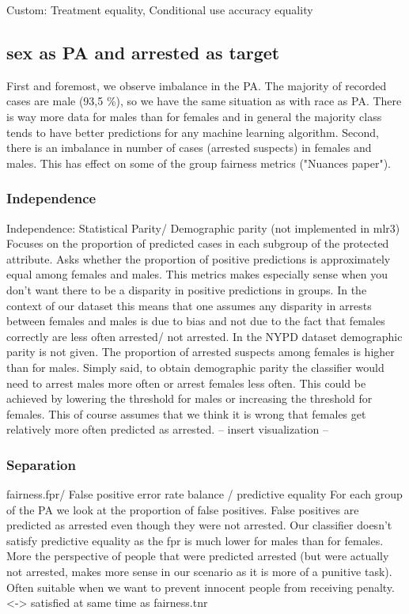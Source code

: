 \documentclass{article}
\begin{document}
Custom: Treatment equality, Conditional use accuracy equality


\subsection{sex as PA and arrested as target}

First and foremost, we observe imbalance in the PA. The majority of recorded cases are male (93,5 \%), so we have the same situation as with race as PA. There is way more data for males than for females and in general the majority class tends to have better predictions for any machine learning algorithm.
Second, there is an imbalance in number of cases (arrested suspects) in females and males. This has effect on some of the group fairness metrics ("Nuances paper").

\subsubsection{Independence}
Independence: Statistical Parity/ Demographic parity (not implemented in mlr3)
Focuses on the proportion of predicted cases in each subgroup of the protected attribute. Asks whether the proportion of positive predictions is approximately equal among females and males.
This metrics makes especially sense when you don't want there to be a disparity in positive predictions in groups. In the context of our dataset this means that one assumes any disparity in arrests between females and males is due to bias and not due to the fact that females correctly are less often arrested/ not arrested. 
In the NYPD dataset demographic parity is not given. The proportion of arrested suspects among females is higher than for males. Simply said, to obtain demographic parity the classifier would need to arrest males more often or arrest females less often. This could be achieved by lowering the threshold for males or increasing the threshold for females. This of course assumes that we think it is wrong that females get relatively more often predicted as arrested.
 -- insert visualization --

\subsubsection{Separation}

fairness.fpr/ False positive error rate balance / predictive equality
For each group of the PA we look at the proportion of false positives. False positives are predicted as arrested even though they were not arrested. Our classifier doesn't satisfy predictive equality as the fpr is much lower for males than for females. More the perspective of people that were predicted arrested (but were actually not arrested, makes more sense in our scenario as it is more of a punitive task). Often suitable when we want to prevent innocent people from receiving penalty.
<-> satisfied at same time as fairness.tnr
\end{document}
